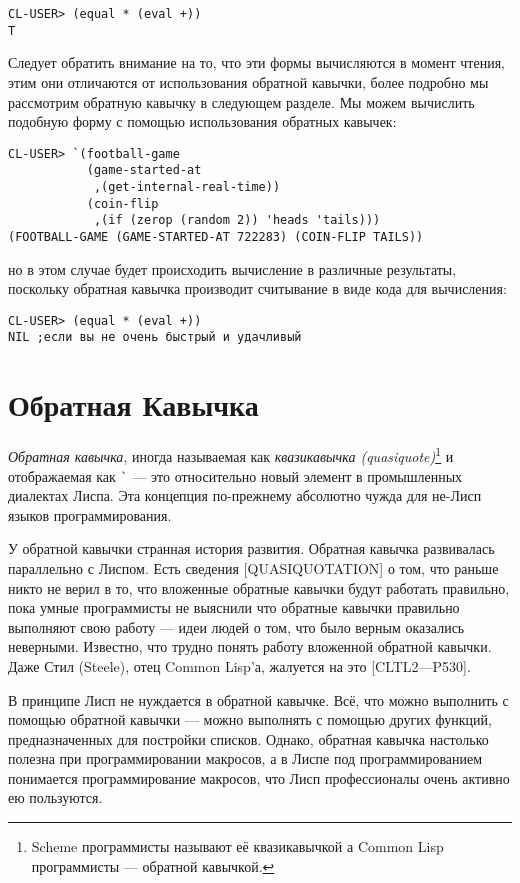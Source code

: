 \begin{verbatim}
CL-USER> (equal * (eval +))
T
\end{verbatim}

Следует обратить внимание на то, что эти формы вычисляются в момент чтения, этим они отличаются от использования обратной кавычки, более подробно мы рассмотрим обратную кавычку в следующем разделе. Мы можем вычислить подобную форму с помощью использования обратных кавычек:

\begin{verbatim}
CL-USER> `(football-game
           (game-started-at
            ,(get-internal-real-time))
           (coin-flip
            ,(if (zerop (random 2)) 'heads 'tails)))
(FOOTBALL-GAME (GAME-STARTED-AT 722283) (COIN-FLIP TAILS))
\end{verbatim}

но в этом случае будет происходить вычисление в различные результаты, поскольку обратная кавычка производит считывание в виде кода для вычисления:

\begin{verbatim}
CL-USER> (equal * (eval +))
NIL ;если вы не очень быстрый и удачливый
\end{verbatim}

\section{Обратная Кавычка}\label{section_backquote}

\emph{Обратная кавычка}, иногда называемая как \emph{квазикавычка (quasiquote)}\footnote{Scheme программисты называют её квазикавычкой а Common Lisp программисты --- обратной кавычкой.} и отображаемая как \verb"`" --- это относительно новый элемент в промышленных диалектах Лиспа. Эта концепция по-прежнему абсолютно чужда для не-Лисп языков программирования.

У обратной кавычки странная история развития. Обратная кавычка развивалась параллельно с Лиспом. Есть сведения [QUASIQUOTATION] о том, что раньше никто не верил в то, что вложенные обратные кавычки будут работать правильно, пока умные программисты не выяснили что обратные кавычки правильно выполняют свою работу --- идеи людей о том, что было верным оказались неверными. Известно, что трудно понять работу вложенной обратной кавычки. Даже Стил (Steele), отец Common Lisp'а, жалуется на это [CLTL2—P530].

В принципе Лисп не нуждается в обратной кавычке. Всё, что можно выполнить с помощью обратной кавычки --- можно выполнять с помощью других функций, предназначенных для постройки списков. Однако, обратная кавычка настолько полезна при программировании макросов, а в Лиспе под программированием понимается программирование макросов, что Лисп профессионалы очень активно ею пользуются.

